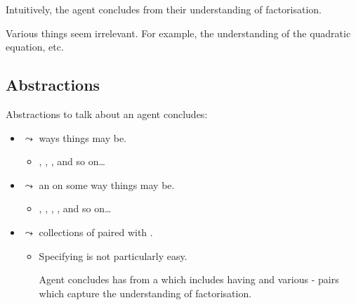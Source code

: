 \documentclass[10pt]{article}
\begin{document}
\begin{note}

  Intuitively, the agent concludes \propI{\rootsCon{}} from their understanding of factorisation.
\end{note}


\begin{note}
  Various things seem irrelevant.
  For example, the \agents{} understanding of the quadratic equation, etc.
\end{note}


\subsection{Abstractions}


\begin{note}
  Abstractions to talk about \eiw{} an agent concludes:

  \begin{itemize}
  \item
     \(\leadsto\) ways things may be.
    \begin{itemize}
    \item
      , , , and so on\dots
    \end{itemize}
  \item
     \(\leadsto\) an \agpe{} on some way things may be.
    \begin{itemize}
    \item
      , , , , and so on\dots
    \end{itemize}
  \item
     \(\leadsto\) collections of  paired with .
    \begin{itemize}
    \item
      Specifying  is not particularly easy.

      Agent concludes \propM{\rootsCon{}} has  from a \pool{} which includes \propM{\rootsConEq{}} having   and various - pairs which capture the \agents{} understanding of factorisation.
    \end{itemize}
  \end{itemize}



\end{note}
\end{document}
